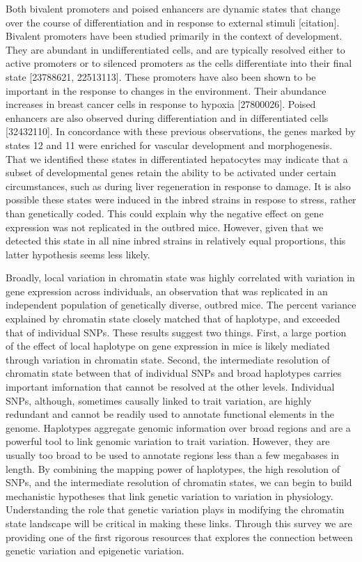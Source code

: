 \documentclass[10pt,letterpaper]{article}
\begin{document}
Both bivalent promoters and poised enhancers are dynamic states that
change over the course of differentiation and in response to external
stimuli {[}citation{]}. Bivalent promoters have been studied primarily
in the context of development. They are abundant in undifferentiated
cells, and are typically resolved either to active promoters or to
silenced promoters as the cells differentiate into their final state
{[}23788621, 22513113{]}. These promoters have also been shown to be
important in the response to changes in the environment. Their abundance
increases in breast cancer cells in response to hypoxia {[}27800026{]}.
Poised enhancers are also observed during differentiation and in
differentiated cells {[}32432110{]}. In concordance with these previous
observations, the genes marked by states 12 and 11 were enriched for
vascular development and morphogenesis. That we identified these states
in differentiated hepatocytes may indicate that a subset of
developmental genes retain the ability to be activated under certain
circumstances, such as during liver regeneration in response to damage.
It is also possible these states were induced in the inbred strains in
respose to stress, rather than genetically coded. This could explain why
the negative effect on gene expression was not replicated in the outbred
mice. However, given that we detected this state in all nine inbred
strains in relatively equal proportions, this latter hypothesis seems
less likely.

Broadly, local variation in chromatin state was highly correlated with
variation in gene expression across individuals, an observation that was
replicated in an independent population of genetically diverse, outbred
mice. The percent variance explained by chromatin state closely matched
that of haplotype, and exceeded that of individual SNPs. These results
suggest two things. First, a large portion of the effect of local
haplotype on gene expression in mice is likely mediated through
variation in chromatin state. Second, the intermediate resolution of
chromatin state between that of individual SNPs and broad haplotypes
carries important imfornation that cannot be resolved at the other
levels. Individual SNPs, although, sometimes causally linked to trait
variation, are highly redundant and cannot be readily used to annotate
functional elements in the genome. Haplotypes aggregate genomic
information over broad regions and are a powerful tool to link genomic
variation to trait variation. However, they are usually too broad to be
used to annotate regions less than a few megabases in length. By
combining the mapping power of haplotypes, the high resolution of SNPs,
and the intermediate resolution of chromatin states, we can begin to
build mechanistic hypotheses that link genetic variation to variation in
physiology. Understanding the role that genetic variation plays in
modifying the chromatin state landscape will be critical in making these
links. Through this survey we are providing one of the first rigorous
resources that explores the connection between genetic variation and
epigenetic variation.
\end{document}
